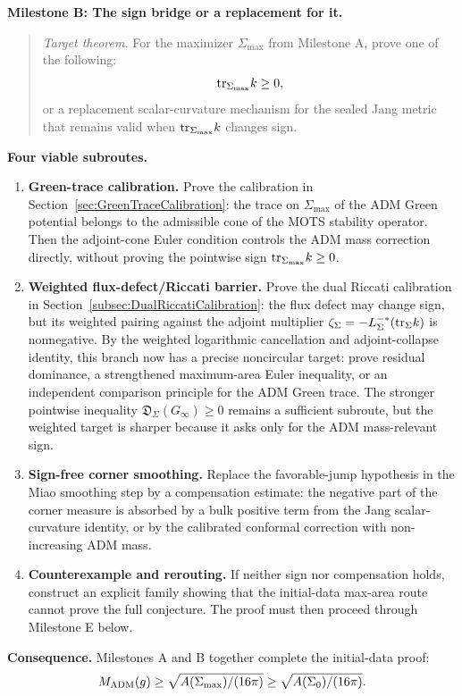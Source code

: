 \textbf{Milestone B: The sign bridge or a replacement for it.}
\begin{quote}
\emph{Target theorem.} For the maximizer $\Sigma_{\max}$ from Milestone A, prove one of the following:
\[
    \mathrm{tr}_{\Sigma_{\max}}k\ge0,
\]
or a replacement scalar-curvature mechanism for the sealed Jang metric that remains valid when $\mathrm{tr}_{\Sigma_{\max}}k$ changes sign.
\end{quote}

\textbf{Four viable subroutes.}
\begin{enumerate}
    \item \textbf{Green-trace calibration.} Prove the calibration in Section~\ref{sec:GreenTraceCalibration}: the trace on \(\Sigma_{\max}\) of the ADM Green potential belongs to the admissible cone of the MOTS stability operator. Then the adjoint-cone Euler condition controls the ADM mass correction directly, without proving the pointwise sign \(\mathrm{tr}_{\Sigma_{\max}}k\ge0\).
    \item \textbf{Weighted flux-defect/Riccati barrier.} Prove the dual Riccati calibration in Section~\ref{subsec:DualRiccatiCalibration}: the flux defect may change sign, but its weighted pairing against the adjoint multiplier \(\zeta_\Sigma=-L_\Sigma^{-*}(\mathrm{tr}_\Sigma k)\) is nonnegative. By the weighted logarithmic cancellation and adjoint-collapse identity, this branch now has a precise noncircular target: prove residual dominance, a strengthened maximum-area Euler inequality, or an independent comparison principle for the ADM Green trace. The stronger pointwise inequality \(\mathfrak D_\Sigma(G_\infty)\ge0\) remains a sufficient subroute, but the weighted target is sharper because it asks only for the ADM mass-relevant sign.
    \item \textbf{Sign-free corner smoothing.} Replace the favorable-jump hypothesis in the Miao smoothing step by a compensation estimate: the negative part of the corner measure is absorbed by a bulk positive term from the Jang scalar-curvature identity, or by the calibrated conformal correction with non-increasing ADM mass.
    \item \textbf{Counterexample and rerouting.} If neither sign nor compensation holds, construct an explicit family showing that the initial-data max-area route cannot prove the full conjecture. The proof must then proceed through Milestone E below.
\end{enumerate}

\textbf{Consequence.} Milestones A and B together complete the initial-data proof:
\[
    M_{\mathrm{ADM}}(g)
    \ge \sqrt{A(\Sigma_{\max})/(16\pi)}
    \ge \sqrt{A(\Sigma_0)/(16\pi)}.
\]

